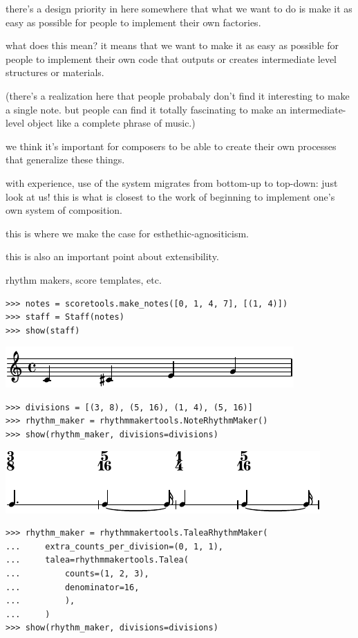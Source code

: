 \documentclass{article}
\begin{document}
there's a design priority in here somewhere that what we want to do is make it
as easy as possible for people to implement their own factories.

what does this mean? it means that we want to make it as easy as possible for
people to implement their own code that outputs or creates intermediate level
structures or materials.

(there's a realization here that people probabaly don't find it interesting to
make a single note. but people can find it totally fascinating to make an
intermediate-level object like a complete phrase of music.)

we think it's important for composers to be able to create their own processes
that generalize these things.

with experience, use of the system migrates from bottom-up to top-down: just
look at us! this is what is closest to the work of beginning to implement one's
own system of composition.

this is where we make the case for esthethic-agnositicism.

this is also an important point about extensibility.

rhythm makers, score templates, etc.

\begin{lstlisting}
>>> notes = scoretools.make_notes([0, 1, 4, 7], [(1, 4)])
>>> staff = Staff(notes)
>>> show(staff)
\end{lstlisting}

\noindent\includegraphics[scale=1.0]{images/abjad-3.pdf}


\begin{lstlisting}
>>> divisions = [(3, 8), (5, 16), (1, 4), (5, 16)]
>>> rhythm_maker = rhythmmakertools.NoteRhythmMaker()
>>> show(rhythm_maker, divisions=divisions)
\end{lstlisting}

\noindent\includegraphics[scale=1.0]{images/abjad-4.pdf}


\begin{lstlisting}
>>> rhythm_maker = rhythmmakertools.TaleaRhythmMaker(
...     extra_counts_per_division=(0, 1, 1),
...     talea=rhythmmakertools.Talea(
...         counts=(1, 2, 3),
...         denominator=16,
...         ),
...     )
>>> show(rhythm_maker, divisions=divisions)
\end{lstlisting}
\end{document}

